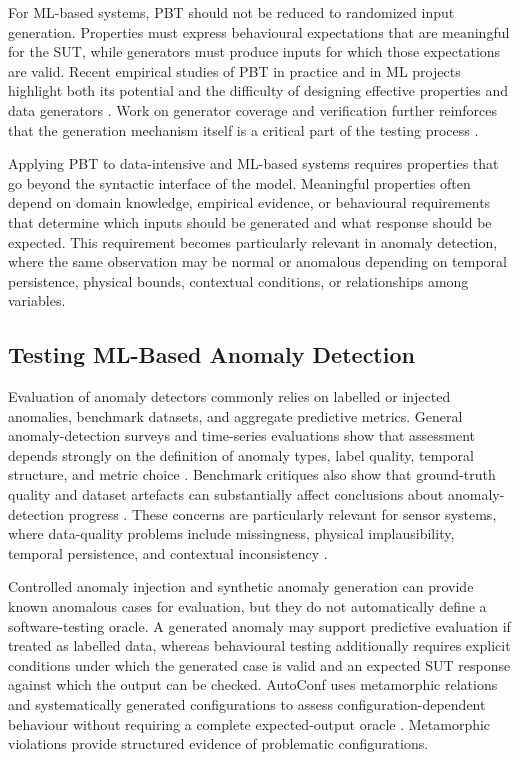 \documentclass[preprint,12pt]{elsarticle}
\begin{document}
For ML-based systems, PBT should not be reduced to randomized input
generation. Properties must express behavioural expectations that are
meaningful for the SUT, while generators must produce inputs for which those
expectations are valid. Recent empirical studies of PBT in practice and in ML
projects highlight both its potential and the difficulty of designing
effective properties and data generators
\cite{wauters2024pbtMLProjects,oliveira2026pbtPython}. Work on generator
coverage and verification further reinforces that the generation mechanism
itself is a critical part of the testing process
\cite{zhou2023coverageGenerators}.

Applying PBT to data-intensive and ML-based systems requires properties that
go beyond the syntactic interface of the model. Meaningful properties often
depend on domain knowledge, empirical evidence, or behavioural requirements
that determine which inputs should be generated and what response should be
expected. This requirement becomes particularly relevant in anomaly detection,
where the same observation may be normal or anomalous depending on temporal
persistence, physical bounds, contextual conditions, or relationships among
variables.


\subsection{Testing ML-Based Anomaly Detection}

Evaluation of anomaly detectors commonly relies on labelled or injected
anomalies, benchmark datasets, and aggregate predictive metrics. General
anomaly-detection surveys and time-series evaluations show that assessment
depends strongly on the definition of anomaly types, label quality, temporal
structure, and metric choice
\cite{10.1145/1541880.1541882,schmidl2022timeeval}. Benchmark critiques also
show that ground-truth quality and dataset artefacts can substantially affect
conclusions about anomaly-detection progress
\cite{wu2021benchmarks}. These concerns are particularly relevant for sensor
systems, where data-quality problems include missingness, physical
implausibility, temporal persistence, and contextual inconsistency
\cite{karkouch2016data,teh2020sensor}.

Controlled anomaly injection and synthetic anomaly generation can provide
known anomalous cases for evaluation, but they do not automatically define a
software-testing oracle. A generated anomaly may support predictive evaluation
if treated as labelled data, whereas behavioural testing additionally requires
explicit conditions under which the generated case is valid and an expected
SUT response against which the output can be checked. AutoConf uses
metamorphic relations and systematically generated configurations to assess
configuration-dependent behaviour without requiring a complete expected-output
oracle \cite{shar2023autoconf}. Metamorphic violations provide structured
evidence of problematic configurations.
\end{document}
